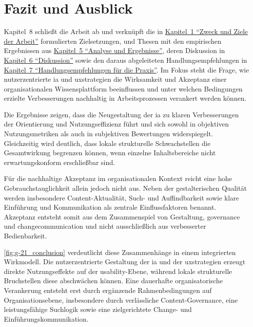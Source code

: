 \chapter{Fazit und Ausblick}
\label{ch:08_conclusion-and-outlook}

Kapitel~8 schließt die Arbeit ab und verknüpft die in \hyperref[ch:01_purpose-and-objectives]{Kapitel~1 \enquote{Zweck und Ziele der Arbeit}} formulierten Zielsetzungen,  und Thesen mit den empirischen Ergebnissen aus \hyperref[ch:05_analysis-and-results]{Kapitel~5 \enquote{Analyse und Ergebnisse}}, deren Diskussion in \hyperref[ch:06_discussion]{Kapitel~6 \enquote{Diskussion}} sowie den daraus abgeleiteten Handlungsempfehlungen in \hyperref[ch:07_recommendations]{Kapitel~7 \enquote{Handlungsempfehlungen für die Praxis}}. Im Fokus steht die Frage, wie nutzerzentrierte \Gls{ia} und \Gls{uxstrategien} die Wirksamkeit und Akzeptanz einer organisationalen Wissensplattform beeinflussen und unter welchen Bedingungen erzielte Verbesserungen nachhaltig in Arbeitsprozessen verankert werden können.

Die Ergebnisse zeigen, dass die Neugestaltung der \Gls{ia} zu klaren Verbesserungen der Orientierung und Nutzungseffizienz führt und sich sowohl in objektiven Nutzungsmetriken als auch in subjektiven Bewertungen widerspiegelt. Gleichzeitig wird deutlich, dass lokale strukturelle Schwachstellen die Gesamtwirkung begrenzen können, wenn einzelne Inhaltsbereiche nicht erwartungskonform erschließbar sind.

Für die nachhaltige Akzeptanz im organisationalen Kontext reicht eine hohe Gebrauchstauglichkeit allein jedoch nicht aus. Neben der gestalterischen Qualität werden insbesondere Content-Aktualität, Such- und Auffindbarkeit sowie klare Einführung und Kommunikation als zentrale Einflussfaktoren benannt. Akzeptanz entsteht somit aus dem Zusammenspiel von Gestaltung, \Gls{governance} und \Gls{changecommunication} und nicht ausschließlich aus verbesserter Bedienbarkeit.


\autoref{fig:g-21_conclusion} verdeutlicht diese Zusammenhänge in einem integrierten Wirkmodell. Die nutzerzentrierte Gestaltung der \Gls{ia} und der \Gls{uxstrategien} erzeugt direkte Nutzungseffekte auf der \Gls{usability}-Ebene, während lokale strukturelle Bruchstellen diese abschwächen können. Eine dauerhafte organisatorische Verankerung entsteht erst durch ergänzende Rahmenbedingungen auf Organisationsebene, insbesondere durch verlässliche Content-Governance, eine leistungsfähige Suchlogik sowie eine zielgerichtete Change- und Einführungskommunikation.

